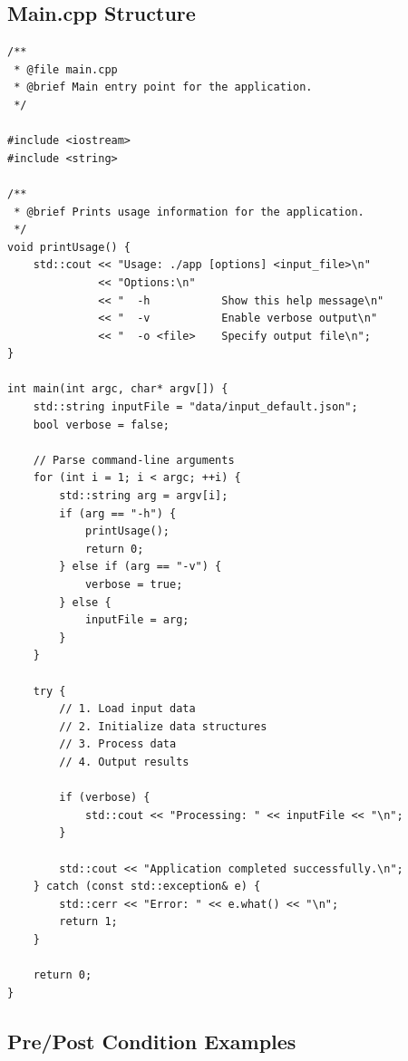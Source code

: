 \subsection{Main.cpp Structure}

\begin{lstlisting}[style=cpp, caption={Example: src/main.cpp}]
/**
 * @file main.cpp
 * @brief Main entry point for the application.
 */

#include <iostream>
#include <string>

/**
 * @brief Prints usage information for the application.
 */
void printUsage() {
    std::cout << "Usage: ./app [options] <input_file>\n"
              << "Options:\n"
              << "  -h           Show this help message\n"
              << "  -v           Enable verbose output\n"
              << "  -o <file>    Specify output file\n";
}

int main(int argc, char* argv[]) {
    std::string inputFile = "data/input_default.json";
    bool verbose = false;

    // Parse command-line arguments
    for (int i = 1; i < argc; ++i) {
        std::string arg = argv[i];
        if (arg == "-h") {
            printUsage();
            return 0;
        } else if (arg == "-v") {
            verbose = true;
        } else {
            inputFile = arg;
        }
    }

    try {
        // 1. Load input data
        // 2. Initialize data structures
        // 3. Process data
        // 4. Output results

        if (verbose) {
            std::cout << "Processing: " << inputFile << "\n";
        }

        std::cout << "Application completed successfully.\n";
    } catch (const std::exception& e) {
        std::cerr << "Error: " << e.what() << "\n";
        return 1;
    }

    return 0;
}
\end{lstlisting}

\subsection{Pre/Post Condition Examples}

